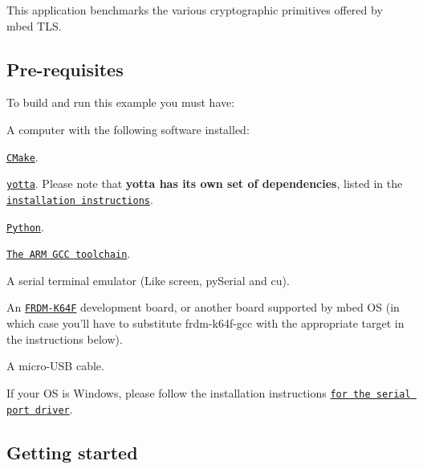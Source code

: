 This application benchmarks the various cryptographic primitives offered by mbed T\-L\-S.

\subsection*{Pre-\/requisites}

To build and run this example you must have\-:
\begin{DoxyItemize}
\item A computer with the following software installed\-:
\begin{DoxyItemize}
\item \href{http://www.cmake.org/download/}{\tt C\-Make}.
\item \href{https://github.com/ARMmbed/yotta}{\tt yotta}. Please note that {\bfseries yotta has its own set of dependencies}, listed in the \href{http://armmbed.github.io/yotta/#installing-on-windows}{\tt installation instructions}.
\item \href{https://www.python.org/downloads/}{\tt Python}.
\item \href{https://launchpad.net/gcc-arm-embedded}{\tt The A\-R\-M G\-C\-C toolchain}.
\item A serial terminal emulator (Like screen, py\-Serial and cu).
\end{DoxyItemize}
\item An \href{http://developer.mbed.org/platforms/FRDM-K64F/}{\tt F\-R\-D\-M-\/\-K64\-F} development board, or another board supported by mbed O\-S (in which case you'll have to substitute frdm-\/k64f-\/gcc with the appropriate target in the instructions below).
\item A micro-\/\-U\-S\-B cable.
\item If your O\-S is Windows, please follow the installation instructions \href{https://developer.mbed.org/handbook/Windows-serial-configuration}{\tt for the serial port driver}.
\end{DoxyItemize}

\subsection*{Getting started}



